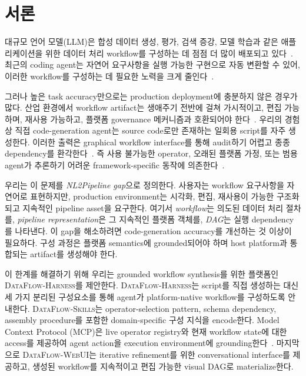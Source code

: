 

\section{서론}

대규모 언어 모델(LLM)은 합성 데이터 생성, 평가, 검색 증강, 모델 학습과 같은 애플리케이션을 위한 데이터 처리 workflow를 구성하는 데 점점 더 많이 배포되고 있다~\cite{hong2025data, khattab2024dspy, gao2023retrieval}. 최근의 coding agent는 자연어 요구사항을 실행 가능한 구현으로 자동 변환할 수 있어, 이러한 workflow를 구성하는 데 필요한 노력을 크게 줄인다~\cite{galster2026configuring,wu2024autogen}.

그러나 높은 task accuracy만으로는 production deployment에 충분하지 않은 경우가 많다. 산업 환경에서 workflow artifact는 생애주기 전반에 걸쳐 가시적이고, 편집 가능하며, 재사용 가능하고, 플랫폼 governance 메커니즘과 호환되어야 한다~\cite{kreuzberger2023machine}. 우리의 경험상 직접 code-generation agent는 source code로만 존재하는 일회용 script를 자주 생성한다. 이러한 출력은 graphical workflow interface를 통해 audit하기 어렵고 종종 dependency를 환각한다~\cite{patil2024gorilla, qin2024toolllm}. 즉 사용 불가능한 operator, 오래된 플랫폼 가정, 또는 범용 agent가 추론하기 어려운 framework-specific 동작에 의존한다~\cite{liu2024agentbench, qin2024tool, qiao2023taskweaver}.

우리는 이 문제를 \textit{NL2Pipeline gap}으로 정의한다. 사용자는 workflow 요구사항을 자연어로 표현하지만, production environment는 시각화, 편집, 재사용이 가능한 구조화되고 지속적인 pipeline asset을 요구한다. 여기서 \emph{workflow}는 의도된 데이터 처리 절차를, \emph{pipeline representation}은 그 지속적인 플랫폼 객체를, \emph{DAG}는 실행 dependency를 나타낸다. 이 gap을 해소하려면 code-generation accuracy를 개선하는 것 이상이 필요하다. 구성 과정은 플랫폼 semantics에 grounded되어야 하며 host platform과 통합되는 artifact를 생성해야 한다.

이 한계를 해결하기 위해 우리는 grounded workflow synthesis를 위한 플랫폼인 \textsc{DataFlow-Harness}를 제안한다. \textsc{DataFlow-Harness}는 script를 직접 생성하는 대신 세 가지 분리된 구성요소를 통해 agent가 platform-native workflow를 구성하도록 안내한다. \textsc{DataFlow-Skills}는 operator-selection pattern, schema dependency, assembly procedure를 포함한 domain-specific 구성 지식을 encode한다. Model Context Protocol (MCP)은 live operator registry와 현재 workflow state에 대한 access를 제공하여 agent action을 execution environment에 grounding한다~\cite{anthropic2024mcp}. 마지막으로 \textsc{DataFlow-WebUI}는 iterative refinement를 위한 conversational interface를 제공하고, 생성된 workflow를 지속적이고 편집 가능한 visual DAG로 materialize한다.

